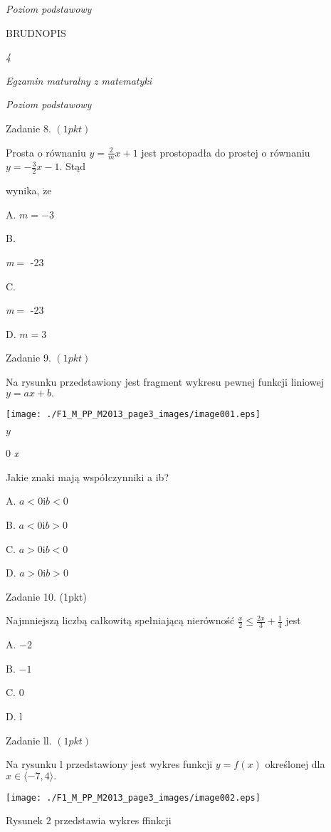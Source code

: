\documentclass[a4paper,12pt]{article}
\begin{document}
{\it Poziom podstawowy}

BRUDNOPIS





{\it 4}

{\it Egzamin maturalny z matematyki}

{\it Poziom podstawowy}

Zadanie 8. $(1pkt)$

Prosta o równaniu $y=\displaystyle \frac{2}{m}x+1$ jest prostopadła do prostej o równaniu $y=-\displaystyle \frac{3}{2}x-1$. Stąd

wynika, $\dot{\mathrm{z}}\mathrm{e}$

A. $m=-3$

B.

{\it m}$=$ -23

C.

{\it m}$=$ -23

D. $m=3$

Zadanie 9. $(1pkt)$

Na rysunku przedstawiony jest fragment wykresu pewnej funkcji liniowej $y=ax+b.$
\begin{center}
\texttt{[image: ./F1\_M\_PP\_M2013\_page3\_images/image001.eps]}
\end{center}
$y$

0  {\it x}

Jakie znaki mają współczynniki a ib?

A. $a<0 \mathrm{i}b<0$

B. $a<0 \mathrm{i}b>0$

C. $a>0 \mathrm{i}b<0$

D. $a>0\mathrm{i}b>0$

Zadanie 10. (1pkt)

Najmniejszą liczbą całkowitą spełniającą nierówność $\displaystyle \frac{x}{2}\leq\frac{2x}{3}+\frac{1}{4}$ jest

A. $-2$

B. $-1$

C. 0

D. l

Zadanie ll. $(1pkt)$

Na rysunku l przedstawiony jest wykres funkcji $y=f(x)$ określonej dla $x\in\langle-7,4\rangle.$
\begin{center}
\texttt{[image: ./F1\_M\_PP\_M2013\_page3\_images/image002.eps]}
\end{center}
Rysunek 2 przedstawia wykres ffinkcji
\end{document}
